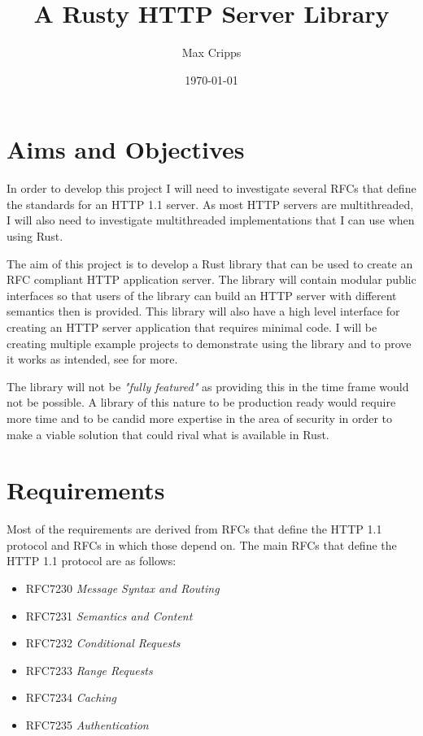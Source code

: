 \documentclass[12pt, a4paper]{article}
\title{A Rusty HTTP Server Library}
\author{Max Cripps}
\date{\today}
\begin{document}
\maketitle \newpage

\tableofcontents \newpage

\section{Aims and Objectives}

In order to develop this project I will need to investigate several RFCs that define the standards
for an HTTP 1.1 server. As most HTTP servers are multithreaded, I will also need to investigate multithreaded
implementations that I can use when using Rust. 

The aim of this project is to develop a Rust library that can be used to create an RFC compliant
HTTP application server. The library will contain modular public interfaces so that users of the
library can build an HTTP server with different semantics then is provided. This library will also
have a high level interface for creating an HTTP server application that requires minimal code. I will
be creating multiple example projects to demonstrate using the library and to prove it works as intended,
see \emph{} for more.

The library will not be \emph{"fully featured"} as providing this in the time frame would not be
possible. A library of this nature to be production ready would require more time and to be candid
more expertise in the area of security in order to make a viable solution that could rival what is
available in Rust.

\section{Requirements} \label{sec:requirements}

Most of the requirements are derived from RFCs that define the HTTP 1.1 protocol and RFCs in which
those depend on. The main RFCs that define the HTTP 1.1 protocol are as follows:
\begin{itemize}
  \item RFC7230 \emph{Message Syntax and Routing}
  \item RFC7231 \emph{Semantics and Content}
  \item RFC7232 \emph{Conditional Requests}
  \item RFC7233 \emph{Range Requests}
  \item RFC7234 \emph{Caching}
  \item RFC7235 \emph{Authentication}
\end{itemize}
\end{document}
